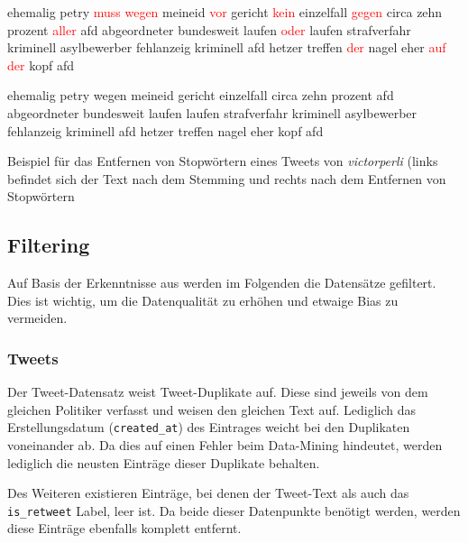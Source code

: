 \begin{code}[H]
    \begin{minipage}{0.45\textwidth}
        \small
        ehemalig petry \textcolor{red}{muss wegen} meineid \textcolor{red}{vor} gericht \textcolor{red}{kein} einzelfall \textcolor{red}{gegen} circa zehn prozent \textcolor{red}{aller} afd abgeordneter bundesweit laufen \textcolor{red}{oder} laufen strafverfahr kriminell asylbewerber fehlanzeig kriminell afd hetzer treffen \textcolor{red}{der} nagel eher \textcolor{red}{auf der} kopf afd
    \end{minipage}\hfill
    \begin{minipage}{0.45\textwidth}
        \small
        ehemalig petry wegen meineid gericht einzelfall circa zehn prozent afd abgeordneter bundesweit laufen laufen strafverfahr kriminell asylbewerber fehlanzeig kriminell afd hetzer treffen nagel eher kopf afd
    \end{minipage}\hfill
    \caption[Beispiel -- Entfernen von Stopwörtern]{Beispiel für das Entfernen von Stopwörtern eines Tweets von \textit{victorperli} (links befindet sich der Text nach dem Stemming und rechts nach dem Entfernen von Stopwörtern} \label{list:stopwords}
\end{code}

\subsection{Filtering} \label{subsec:filtering}

Auf Basis der Erkenntnisse aus  werden im Folgenden die Datensätze gefiltert. Dies ist wichtig, um die Datenqualität zu erhöhen und etwaige Bias zu vermeiden.

\subsubsection*{Tweets}

Der Tweet-Datensatz \textcite{saltzer_finding_2022} weist Tweet-Duplikate auf. Diese sind jeweils von dem gleichen Politiker verfasst und weisen den gleichen Text auf. Lediglich das Erstellungsdatum (\texttt{created\_at}) des Eintrages weicht bei den Duplikaten voneinander ab. Da dies auf einen Fehler beim Data-Mining hindeutet, werden lediglich die neusten Einträge dieser Duplikate behalten.

Des Weiteren existieren Einträge, bei denen der Tweet-Text als auch das \texttt{is\_retweet} Label, leer ist. Da beide dieser Datenpunkte benötigt werden, werden diese Einträge ebenfalls komplett entfernt. 

